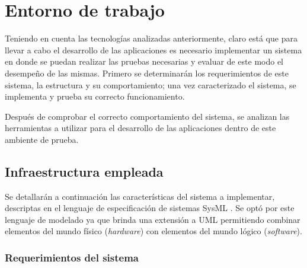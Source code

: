 
\chapter{Entorno de trabajo} %

\label{Chapter4} %
Teniendo en cuenta las tecnologías analizadas anteriormente, claro está que para llevar a cabo el desarrollo de las aplicaciones es necesario implementar un sistema en donde se puedan realizar las pruebas necesarias y evaluar de este modo el desempeño de las mismas. Primero se determinarán los requerimientos de este sistema, la estructura y su comportamiento; una vez caracterizado el sistema, se implementa y prueba su correcto funcionamiento. 

Después de comprobar el correcto comportamiento del sistema, se analizan las herramientas a utilizar para el desarrollo de las aplicaciones dentro de este ambiente de prueba. 


\section{Infraestructura empleada}
Se detallarán a continuación las características del sistema a implementar, descriptas en el lenguaje de especificación de sistemas SysML \parencite{sysml}. Se optó por este lenguaje de modelado ya que brinda una extensión a UML permitiendo combinar elementos del mundo físico (\textit{hardware}) con elementos del mundo lógico (\textit{software}). 


\subsection{Requerimientos del sistema}

